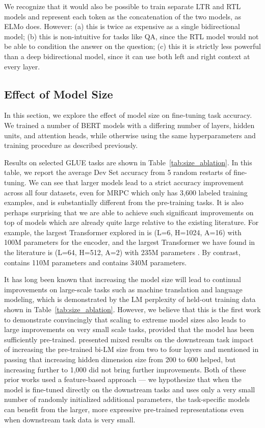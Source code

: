 We recognize that it would also be possible to train separate LTR and RTL models and represent each token as the concatenation of the two models, as ELMo does. However: (a) this is twice as expensive as a single bidirectional model; (b) this is non-intuitive for tasks like QA, since the RTL model would not be able to condition the answer on the question; (c) this it is strictly less powerful than a deep bidirectional model, since it can use both left and right context at every layer.

\subsection{Effect of Model Size}
\label{sec:model_size_ablation}

In this section, we explore the effect of model size on fine-tuning task accuracy. We trained a number of BERT models with a differing number of layers, hidden units, and attention heads, while otherwise using the same hyperparameters and training procedure as described previously.

Results on selected GLUE tasks are shown in Table~\ref{tab:size_ablation}. In this table, we report the average Dev Set accuracy from 5 random restarts of fine-tuning. We can see that larger models lead to a strict accuracy improvement across all four datasets, even for MRPC which only has 3,600 labeled training examples, and is substantially different from the pre-training tasks. It is also perhaps surprising that we are able to achieve such significant improvements on top of models which are already quite large relative to the existing literature. For example, the largest Transformer explored in \citet{vaswani-etal:2017:_atten} is (L=6, H=1024, A=16) with 100M parameters for the encoder, and the largest Transformer we have found in the literature is (L=64, H=512, A=2) with 235M parameters \cite{alrfou:2018}. By contrast, \bertbase contains 110M parameters and \bertlarge contains 340M parameters.

It has long been known that increasing the model size will lead to continual improvements on large-scale tasks such as machine translation and language modeling, which is demonstrated by the LM perplexity of held-out training data shown in Table~\ref{tab:size_ablation}. However, we believe that this is the first work to demonstrate convincingly that scaling to extreme model sizes also leads to large improvements on very small scale tasks, provided that the model has been sufficiently pre-trained. \citet{peters2018dissecting} presented mixed results on the downstream task impact of increasing the pre-trained bi-LM size from two to four layers and \citet{melamud2016context2vec} mentioned in passing that increasing hidden dimension size from 200 to 600 helped, but increasing further to 1,000 did not bring further improvements. Both of these prior works used a feature-based approach --- we hypothesize that when the model is fine-tuned directly on the downstream tasks and uses only a very small number of randomly initialized additional parameters, the task-specific models can benefit from the larger, more expressive pre-trained representations even when downstream task data is very small. 

